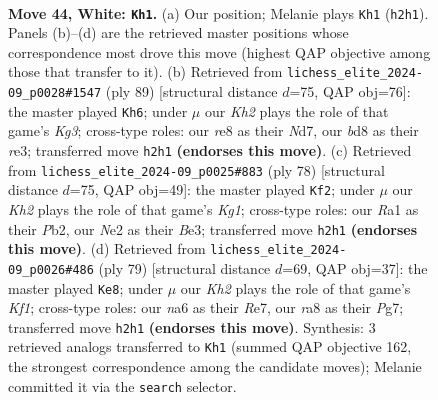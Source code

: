 \documentclass[11pt]{article}
\begin{document}
\clearpage

\begin{figure}[p]\centering
\begin{subfigure}{0.46\textwidth}\centering
\resizebox{\linewidth}{!}{%
\newchessgame
\chessboard[
  setfen={r2br3/1p5p/nk4pP/p3Pp2/P2p4/3R2P1/1B2N2K/R7 w - - 0 44},
  showmover=false,
  pgfstyle=straightmove, color=movearrow, markmove={h2-h1}
]}
\caption{}
\end{subfigure}\hfill
\begin{subfigure}{0.46\textwidth}\centering
\resizebox{\linewidth}{!}{%
\newchessgame
\chessboard[
  setfen={4N1R1/1p1n1pp1/4p1k1/1P2P2p/8/4RKPP/5P2/2r3r1 b - - 3 45},
  showmover=false,
  pgfstyle=straightmove, color=movearrow, markmove={g6-h6}
]}
\caption{}
\end{subfigure}
\\[4pt]
\begin{subfigure}{0.46\textwidth}\centering
\resizebox{\linewidth}{!}{%
\newchessgame
\chessboard[
  setfen={r4n2/p5p1/R2Pkp2/1p2p2p/1P5P/4BPP1/1P6/6K1 w - - 2 40},
  showmover=false,
  pgfstyle=straightmove, color=movearrow, markmove={g1-f2}
]}
\caption{}
\end{subfigure}\hfill
\begin{subfigure}{0.46\textwidth}\centering
\resizebox{\linewidth}{!}{%
\newchessgame
\chessboard[
  setfen={5k2/1p2r1p1/1p1bp1Pp/3p4/5P2/P2R1NP1/1P2R1K1/2r5 b - - 2 40},
  showmover=false,
  pgfstyle=straightmove, color=movearrow, markmove={f8-e8}
]}
\caption{}
\end{subfigure}
\caption{\textbf{Move 44, White: \texttt{Kh1}.} (a) Our position; Melanie plays \texttt{Kh1} (\texttt{h2h1}). Panels (b)--(d) are the retrieved master positions whose correspondence most drove this move (highest QAP objective among those that transfer to it). (b) Retrieved from \texttt{lichess\_elite\_2024-09\_p0028\#1547} (ply 89) [structural distance $d$=75, QAP obj=76]: the master played \texttt{Kh6}; under $\mu$ our \emph{Kh2} plays the role of that game's \emph{Kg3}; cross-type roles: our \emph{r}e8 as their \emph{N}d7, our \emph{b}d8 as their \emph{r}e3; transferred move \texttt{h2h1} \textbf{(endorses this move)}. (c) Retrieved from \texttt{lichess\_elite\_2024-09\_p0025\#883} (ply 78) [structural distance $d$=75, QAP obj=49]: the master played \texttt{Kf2}; under $\mu$ our \emph{Kh2} plays the role of that game's \emph{Kg1}; cross-type roles: our \emph{R}a1 as their \emph{P}b2, our \emph{N}e2 as their \emph{B}e3; transferred move \texttt{h2h1} \textbf{(endorses this move)}. (d) Retrieved from \texttt{lichess\_elite\_2024-09\_p0026\#486} (ply 79) [structural distance $d$=69, QAP obj=37]: the master played \texttt{Ke8}; under $\mu$ our \emph{Kh2} plays the role of that game's \emph{Kf1}; cross-type roles: our \emph{n}a6 as their \emph{R}e7, our \emph{r}a8 as their \emph{P}g7; transferred move \texttt{h2h1} \textbf{(endorses this move)}. Synthesis: 3 retrieved analogs transferred to \texttt{Kh1} (summed QAP objective 162, the strongest correspondence among the candidate moves); Melanie committed it via the \texttt{search} selector.}
\label{fig:thought-m86}
\end{figure}
\end{document}
